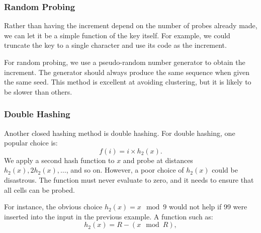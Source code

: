 \subsubsection{Random Probing}
Rather than having the increment depend on the number of probes already made, we can let it be a simple function of the key itself. For example, we could truncate the key to a single character and use its code as the increment.

For random probing, we use a pseudo-random number generator to obtain the increment. The generator should always produce the same sequence when given the same seed. This method is excellent at avoiding clustering, but it is likely to be slower than others.

\subsubsection{Double Hashing}
Another closed hashing method is double hashing. For double hashing, one popular choice is:
\[
f(i) = i \times h_2(x).
\]
We apply a second hash function to \(x\) and probe at distances \(h_2(x), 2h_2(x), \dots\), and so on. However, a poor choice of \(h_2(x)\) could be disastrous. The function must never evaluate to zero, and it needs to ensure that all cells can be probed.  

For instance, the obvious choice \(h_2(x) = x \mod 9\) would not help if 99 were inserted into the input in the previous example. A function such as:
\[
h_2(x) = R - (x \mod R),
\]

